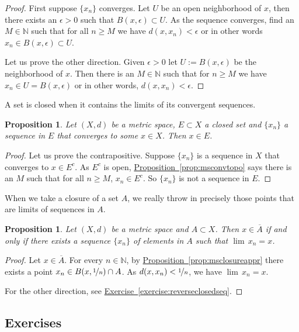 \documentclass[12pt]{book}
\newcommand{\N}{{\mathbb{N}}}
\theoremstyle{plain}
\newtheorem{prop}[thm]{Proposition}
\theoremstyle{remark}
\theoremstyle{definition}
\theoremstyle{exercise}
\theoremstyle{example}
\newcommand{\exerciseref}[1]{\hyperref[#1]{Exercise~\ref*{#1}}}
\newcommand{\propref}[1]{\hyperref[#1]{Proposition~\ref*{#1}}}
\begin{document}
\begin{proof}
First suppose $\{ x_n \}$ converges.  Let $U$ be an open neighborhood
of $x$, then there exists an $\epsilon > 0$ such that $B(x,\epsilon) \subset
U$.  As the sequence converges, find an $M \in \N$ such that for all $n \geq
M$ we have $d(x,x_n) < \epsilon$ or in other words $x_n \in B(x,\epsilon)
\subset U$.

Let us prove the other direction.  Given $\epsilon > 0$ let $U :=
B(x,\epsilon)$ be the neighborhood of $x$.  Then there is an $M \in \N$
such that for $n \geq M$ we have $x_n \in U = B(x,\epsilon)$ or in other
words, $d(x,x_n) < \epsilon$.
\end{proof}

A set is closed when it contains the limits of its convergent sequences.

\begin{prop} \label{prop:msclosedlim}
Let $(X,d)$ be a metric space, $E \subset X$ a closed set
and $\{ x_n \}$ a sequence in $E$ that converges to some $x \in X$.
Then $x \in E$.
\end{prop}

\begin{proof}
Let us prove the contrapositive.
Suppose $\{ x_n \}$ is a sequence in $X$ that converges to $x \in E^c$.
As $E^c$ is open, \propref{prop:msconvtopo} says there is
an $M$ such that for all $n \geq M$,
$x_n \in E^c$.  So $\{ x_n \}$  is not a sequence in $E$.
\end{proof}

When we take a closure of a set $A$, we really throw in precisely 
those points that are limits of sequences in $A$.

\begin{prop} \label{prop:msclosureapprseq}
Let $(X,d)$ be a metric space and $A \subset X$.
Then $x \in \overline{A}$ if and only if there exists a sequence $\{ x_n \}$ of
elements in $A$ such that $\lim\, x_n = x$.
\end{prop}

\begin{proof}
Let $x \in \overline{A}$.  For every $n \in \N$,
by
\propref{prop:msclosureappr} there
exists a point $x_n \in B(x,\nicefrac{1}{n}) \cap A$.
As $d(x,x_n) < \nicefrac{1}{n}$, we have $\lim\, x_n = x$.

For the other direction, see \exerciseref{exercise:reverseclosedseq}.
\end{proof}

\subsection{Exercises}
\end{document}
